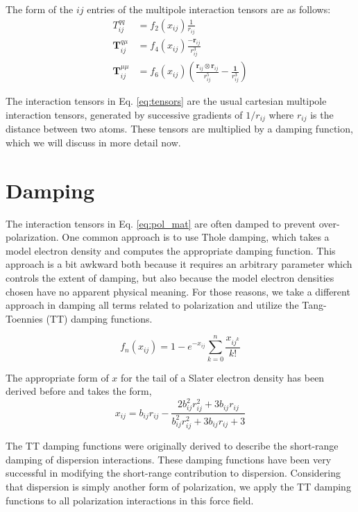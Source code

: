 \documentclass[journal=jacsat,manuscript=article]{achemso}
\begin{document}
The form of the $ij$ entries of the multipole interaction tensors are as follows:
\begin{align}
  T^{qq}_{ij}&=f_2(x_{ij})\frac{1}{r_{ij}} \\
  \bm{T}^{q\mu}_{ij}&=f_4(x_{ij})\frac{-\bm{r}_{ij}}{r_{ij}^3} \\
  \bm{T}^{\mu\mu}_{ij}&=f_6(x_{ij})\left(\frac{\bm{r}_{ij}\otimes\bm{r}_{ij}}{r_{ij}^5}-\frac{\bm{1}}{r_{ij}^3}\right)
  \label{eq:tensors}
\end{align}

The interaction tensors in Eq. \ref{eq:tensors} are the usual cartesian multipole interaction
tensors, generated by successive gradients of $1/r_{ij}$ where $r_{ij}$ is the distance between
two atoms. These tensors are multiplied by a damping function, which we will discuss in more detail
now.

\section*{Damping}

The interaction tensors in Eq. \ref{eq:pol_mat} are often
damped to prevent over-polarization. One common approach is to use Thole damping\cite{thole1981molecular},
which takes a model electron density and computes the appropriate damping function. This approach is
a bit awkward both because it requires an arbitrary parameter which controls the extent of damping,
but also because the model electron densities chosen have no apparent physical meaning.
For those reasons, we take a different approach in damping all terms related to polarization and
utilize the Tang-Toennies (TT) damping functions\cite{tang1984improved}.

\begin{equation}
  f_n(x_{ij}) = 1-e^{-x_{ij}}\sum_{k=0}^n\frac{x_{ij^k}}{k!}
  \label{eq:TT}
\end{equation}

The appropriate form of $x$ for the tail of a Slater electron density
has been derived before\cite{van2016beyond} and takes the form,
\begin{equation}
  x_{ij}=b_{ij}r_{ij}-\frac{2b_{ij}^2r_{ij}^2+3b_{ij}r_{ij}}{b_{ij}^2r_{ij}^2+3b_{ij}r_{ij}+3}
  \label{eq:TT_x}
\end{equation}

The TT damping functions were originally derived to describe the short-range damping
of dispersion interactions. These damping functions have been very successful in
modifying the short-range contribution to dispersion. Considering that dispersion is
simply another form of polarization, we apply the TT damping functions to all
polarization interactions in this force field.
\end{document}
